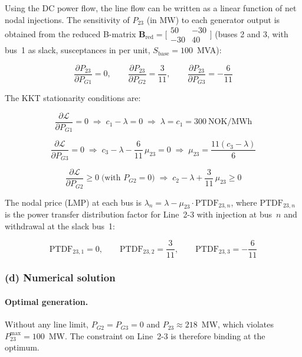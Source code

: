 Using the DC power flow, the line flow can be written as a linear function
of net nodal injections.  The sensitivity of $P_{23}$ (in MW) to each
generator output is obtained from the reduced B-matrix
$\mathbf{B}_{\text{red}} = \bigl[\begin{smallmatrix}50&-30\\-30&40\end{smallmatrix}\bigr]$
(buses 2 and 3, with bus~1 as slack, susceptances in per unit,
$S_{\text{base}}=100$~MVA):

\[
  \frac{\partial P_{23}}{\partial P_{G1}} = 0,\qquad
  \frac{\partial P_{23}}{\partial P_{G2}} = \frac{3}{11},\qquad
  \frac{\partial P_{23}}{\partial P_{G3}} = -\frac{6}{11}
\]

The KKT stationarity conditions are:

\[
  \frac{\partial \mathcal{L}}{\partial P_{G1}} = 0
  \;\Rightarrow\; c_1 - \lambda = 0
  \;\Rightarrow\; \lambda = c_1 = 300~\text{NOK/MWh}
\]

\[
  \frac{\partial \mathcal{L}}{\partial P_{G3}} = 0
  \;\Rightarrow\; c_3 - \lambda - \frac{6}{11}\,\mu_{23} = 0
  \;\Rightarrow\; \mu_{23} = \frac{11(c_3 - \lambda)}{6}
\]

\[
  \frac{\partial \mathcal{L}}{\partial P_{G2}} \geq 0
  \;\text{(with } P_{G2} = 0\text{)}
  \;\Rightarrow\; c_2 - \lambda + \frac{3}{11}\,\mu_{23} \geq 0
\]

The nodal price (LMP) at each bus is
$\lambda_n = \lambda - \mu_{23}\cdot\mathrm{PTDF}_{23,n}$,
where $\mathrm{PTDF}_{23,n}$ is the power transfer distribution factor for
Line~2-3 with injection at bus~$n$ and withdrawal at the slack bus~1:

\[
  \mathrm{PTDF}_{23,1} = 0,\qquad
  \mathrm{PTDF}_{23,2} = \frac{3}{11},\qquad
  \mathrm{PTDF}_{23,3} = -\frac{6}{11}
\]

\subsubsection*{(d) Numerical solution}

\paragraph{Optimal generation.}

Without any line limit, $P_{G2} = P_{G3} = 0$ and $P_{23} \approx 218$~MW,
which violates $P_{23}^{\max} = 100$~MW.  The constraint on Line~2-3 is
therefore binding at the optimum.

